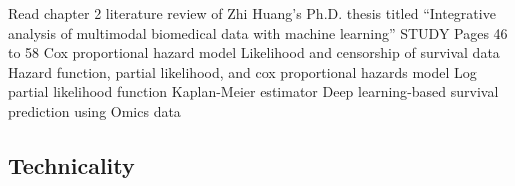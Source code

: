 \documentclass{article}%
\begin{document}
%
Read chapter 2 literature review of Zhi Huang’s Ph.D. thesis titled “Integrative analysis of multimodal biomedical data with machine learning”%
\newline%
\newline%
%
STUDY%
\newline%
\newline%
%
Pages 46 to 58 %
\newline%
\newline%
%
Cox proportional hazard model%
\newline%
\newline%
%
Likelihood and censorship of survival data %
\newline%
\newline%
%
Hazard function, partial likelihood, and cox proportional hazards model %
\newline%
\newline%
%
Log partial likelihood function %
\newline%
\newline%
%
Kaplan{-}Meier estimator %
\newline%
\newline%
%
Deep learning{-}based survival prediction using Omics data %
\newline%
\newline%
%
\subsection{Technicality }%
\label{subsec:Technicality}%
\end{document}
